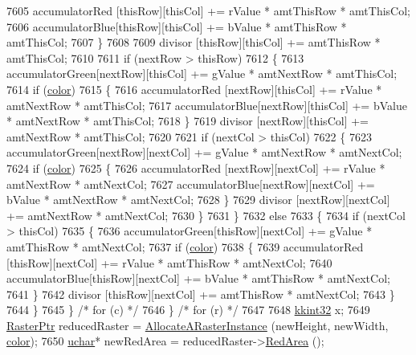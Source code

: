 \begin{DoxyCode}
7605         accumulatorRed [thisRow][thisCol] += rValue * amtThisRow * amtThisCol;
7606         accumulatorBlue[thisRow][thisCol] += bValue * amtThisRow * amtThisCol;
7607       \}
7608 
7609       divisor   [thisRow][thisCol] += amtThisRow * amtThisCol;
7610 
7611       \textcolor{keywordflow}{if}  (nextRow > thisRow)
7612       \{
7613         accumulatorGreen[nextRow][thisCol] += gValue * amtNextRow * amtThisCol;
7614         \textcolor{keywordflow}{if}  (\hyperlink{class_k_k_b_1_1_raster_a482384d89cc53fa4f36276307c746854}{color})
7615         \{
7616           accumulatorRed [nextRow][thisCol] += rValue * amtNextRow * amtThisCol;
7617           accumulatorBlue[nextRow][thisCol] += bValue * amtNextRow * amtThisCol;
7618         \}
7619         divisor   [nextRow][thisCol] += amtNextRow * amtThisCol;
7620 
7621         \textcolor{keywordflow}{if}  (nextCol > thisCol)
7622         \{
7623           accumulatorGreen[nextRow][nextCol] += gValue * amtNextRow * amtNextCol;
7624           \textcolor{keywordflow}{if}  (\hyperlink{class_k_k_b_1_1_raster_a482384d89cc53fa4f36276307c746854}{color})
7625           \{
7626             accumulatorRed [nextRow][nextCol] += rValue * amtNextRow * amtNextCol;
7627             accumulatorBlue[nextRow][nextCol] += bValue * amtNextRow * amtNextCol;
7628           \}
7629           divisor   [nextRow][nextCol] += amtNextRow * amtNextCol;
7630         \}
7631       \}
7632       \textcolor{keywordflow}{else}
7633       \{
7634         \textcolor{keywordflow}{if}  (nextCol > thisCol)
7635         \{
7636           accumulatorGreen[thisRow][nextCol] += gValue * amtThisRow * amtNextCol;
7637           \textcolor{keywordflow}{if}  (\hyperlink{class_k_k_b_1_1_raster_a482384d89cc53fa4f36276307c746854}{color})
7638           \{
7639             accumulatorRed [thisRow][nextCol] += rValue * amtThisRow * amtNextCol;
7640             accumulatorBlue[thisRow][nextCol] += bValue * amtThisRow * amtNextCol;
7641           \}
7642           divisor   [thisRow][nextCol] += amtThisRow * amtNextCol;
7643         \}
7644       \}
7645     \}  \textcolor{comment}{/*  for (c)  */}
7646   \}  \textcolor{comment}{/*  for (r)  */}
7647 
7648   \hyperlink{namespace_k_k_b_a8fa4952cc84fda1de4bec1fbdd8d5b1b}{kkint32}  x;
7649   \hyperlink{class_k_k_b_1_1_raster}{RasterPtr}  reducedRaster = \hyperlink{class_k_k_b_1_1_raster_aa879980d112c01cb7ad9a3cfc7cd6f64}{AllocateARasterInstance} (newHeight, newWidth, 
      \hyperlink{class_k_k_b_1_1_raster_a482384d89cc53fa4f36276307c746854}{color});
7650   \hyperlink{namespace_k_k_b_ace9969169bf514f9ee6185186949cdf7}{uchar}*  newRedArea   = reducedRaster->\hyperlink{class_k_k_b_1_1_raster_aa3d0f9b4ce0fdd8ac97f996058d09b22}{RedArea}   ();

\end{DoxyCode}

